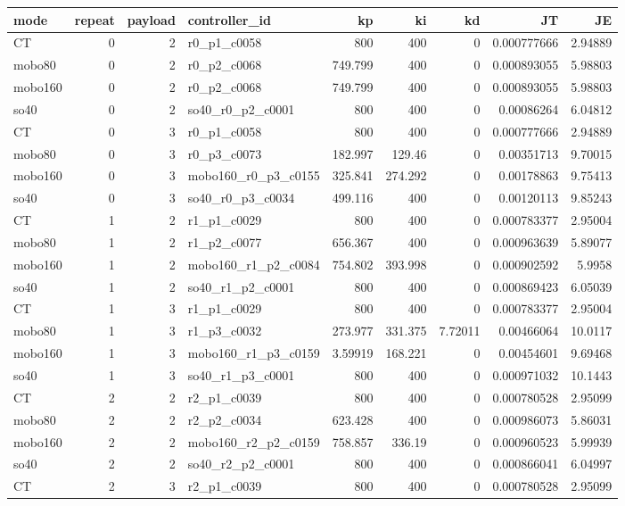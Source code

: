 \begin{tabular}{lrrlrrrrr}
\toprule
mode & repeat & payload & controller\_id & kp & ki & kd & JT & JE \\
\midrule
CT & 0 & 2 & r0\_p1\_c0058 & 800 & 400 & 0 & 0.000777666 & 2.94889 \\
mobo80 & 0 & 2 & r0\_p2\_c0068 & 749.799 & 400 & 0 & 0.000893055 & 5.98803 \\
mobo160 & 0 & 2 & r0\_p2\_c0068 & 749.799 & 400 & 0 & 0.000893055 & 5.98803 \\
so40 & 0 & 2 & so40\_r0\_p2\_c0001 & 800 & 400 & 0 & 0.00086264 & 6.04812 \\
CT & 0 & 3 & r0\_p1\_c0058 & 800 & 400 & 0 & 0.000777666 & 2.94889 \\
mobo80 & 0 & 3 & r0\_p3\_c0073 & 182.997 & 129.46 & 0 & 0.00351713 & 9.70015 \\
mobo160 & 0 & 3 & mobo160\_r0\_p3\_c0155 & 325.841 & 274.292 & 0 & 0.00178863 & 9.75413 \\
so40 & 0 & 3 & so40\_r0\_p3\_c0034 & 499.116 & 400 & 0 & 0.00120113 & 9.85243 \\
CT & 1 & 2 & r1\_p1\_c0029 & 800 & 400 & 0 & 0.000783377 & 2.95004 \\
mobo80 & 1 & 2 & r1\_p2\_c0077 & 656.367 & 400 & 0 & 0.000963639 & 5.89077 \\
mobo160 & 1 & 2 & mobo160\_r1\_p2\_c0084 & 754.802 & 393.998 & 0 & 0.000902592 & 5.9958 \\
so40 & 1 & 2 & so40\_r1\_p2\_c0001 & 800 & 400 & 0 & 0.000869423 & 6.05039 \\
CT & 1 & 3 & r1\_p1\_c0029 & 800 & 400 & 0 & 0.000783377 & 2.95004 \\
mobo80 & 1 & 3 & r1\_p3\_c0032 & 273.977 & 331.375 & 7.72011 & 0.00466064 & 10.0117 \\
mobo160 & 1 & 3 & mobo160\_r1\_p3\_c0159 & 3.59919 & 168.221 & 0 & 0.00454601 & 9.69468 \\
so40 & 1 & 3 & so40\_r1\_p3\_c0001 & 800 & 400 & 0 & 0.000971032 & 10.1443 \\
CT & 2 & 2 & r2\_p1\_c0039 & 800 & 400 & 0 & 0.000780528 & 2.95099 \\
mobo80 & 2 & 2 & r2\_p2\_c0034 & 623.428 & 400 & 0 & 0.000986073 & 5.86031 \\
mobo160 & 2 & 2 & mobo160\_r2\_p2\_c0159 & 758.857 & 336.19 & 0 & 0.000960523 & 5.99939 \\
so40 & 2 & 2 & so40\_r2\_p2\_c0001 & 800 & 400 & 0 & 0.000866041 & 6.04997 \\
CT & 2 & 3 & r2\_p1\_c0039 & 800 & 400 & 0 & 0.000780528 & 2.95099 \\

\end{tabular}
